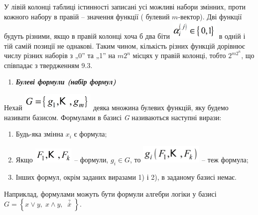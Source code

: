 \documentclass[a4paper]{article}
\newcounter{saveenum}
\newcommand\liststyleWWviiiNumlii{%
\renewcommand\theenumi{\arabic{enumi}}
\renewcommand\theenumii{\arabic{enumii}}
\renewcommand\theenumiii{\arabic{enumiii}}
\renewcommand\theenumiv{\arabic{enumiv}}
\renewcommand\labelenumi{\theenumi.}
\renewcommand\labelenumii{\theenumii.}
\renewcommand\labelenumiii{\theenumiii.}
\renewcommand\labelenumiv{\theenumiv.}
}
\newcommand\liststyleWWviiiNumv{%
\renewcommand\theenumi{\arabic{enumi}}
\renewcommand\theenumii{\arabic{enumii}}
\renewcommand\theenumiii{\arabic{enumiii}}
\renewcommand\theenumiv{\arabic{enumiv}}
\renewcommand\labelenumi{\theenumi)}
\renewcommand\labelenumii{\theenumii.}
\renewcommand\labelenumiii{\theenumiii.}
\renewcommand\labelenumiv{\theenumiv.}
}
\newcounter{}
\begin{document}
\bigskip


\bigskip


\bigskip


\bigskip


\bigskip


\bigskip


\bigskip


\bigskip


\bigskip


\bigskip


\bigskip


\bigskip

У лівій колонці таблиці істинності записані усі можливі набори змінних, проти
кожного набору в правій – значення функції ( булевий   ${m}${}-вектор). Дві
функції будуть різними, якщо в правій колонці хоча б два біти  
\includegraphics[width=0.9335in,height=0.3618in]{crypt-img/crypt-img102.png}  в
одній і тій самій позиції не однакові. Таким чином, кількість різних функцій
дорівнює числу різних наборів з „0” та „1”  на   ${\mathit{m2}^{{n}}}$ місцях у
правій колонці, тобто   ${2^{{\mathit{m2}^{{n}}}}}$, що співпадає з твердженням
 9.3.


\bigskip

\liststyleWWviiiNumlii
\setcounter{saveenum}{\value{enumi}}
\begin{enumerate}
\setcounter{enumi}{\value{saveenum}}
\item {\bfseries\itshape
Булеві формули (набір формул)}
\end{enumerate}
Нехай 
\includegraphics[width=1.3854in,height=0.3465in]{crypt-img/crypt-img103.png} 
деяка множина булевих функцій, яку будемо називати  базисом. Формулами в базисі
 \textit{G  }називаються наступні вирази:

\liststyleWWviiiNumv
\begin{enumerate}
\item Будь-яка змінна  ${x_{{i}}}$ є формула;
\item Якщо 
\includegraphics[width=0.7717in,height=0.2984in]{crypt-img/crypt-img104.png}  –
формули,  ${g_{{i}}\in G}$, то 
\includegraphics[width=1.1811in,height=0.3465in]{crypt-img/crypt-img105.png}  –
теж формула;
\item Інших формул, окрім заданих виразами 1) і 2), в заданому базисі немає.
\end{enumerate}
Наприклад, формулами  можуть бути формули алгебри логіки  у базисі  
${G=\left\{x\vee y,\;x\wedge y,\;\;\overset{{?}}{{x}}\;\right\}}$. 
\end{document}
